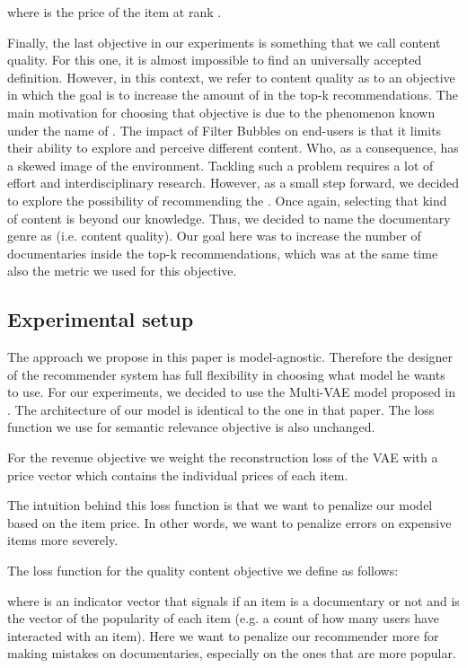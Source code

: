 \documentclass[letterpaper]{article}
\begin{document}
where  is the price of the item at rank . 

Finally, the last objective in our experiments is something that we call content quality. For this one, it is almost impossible to find an universally accepted definition. However, in this context, we refer to content quality as to an objective in which the goal is to increase the amount of  in the top-k recommendations. The main motivation for choosing that objective is due to the phenomenon known under the name of  \cite{nguyen2014exploring}. The impact of Filter Bubbles on end-users is that it limits their ability to explore and perceive different content. Who, as a consequence, has a skewed image of the environment. Tackling such a problem requires a lot of effort and interdisciplinary research. However, as a small step forward, we decided to explore the possibility of recommending the . Once again, selecting that kind of content is beyond our knowledge. Thus, we decided to name the documentary genre as  (i.e. content quality). Our goal here was to increase the number of documentaries inside the top-k recommendations, which was at the same time also the metric we used for this objective.

\subsection{Experimental setup}

The approach we propose in this paper is model-agnostic. Therefore the designer of the recommender system has full flexibility in choosing what model he wants to use. For our experiments, we decided to use the Multi-VAE model proposed in \cite{liang2018variational}. The architecture of our model is identical to the one in that paper. The loss function we use for semantic relevance objective is also unchanged.

For the revenue objective we weight the reconstruction loss of the VAE with a price vector which contains the individual prices of each item.


The intuition behind this loss function is that we want to penalize our model based on the item price. In other words, we want to penalize errors on expensive items more severely.

The loss function for the quality content objective we define as follows:



where  is an indicator vector that signals if an item is a documentary or not and  is the vector of the popularity of each item (e.g. a count of how many users have interacted with an item). Here we want to penalize our recommender more for making mistakes on documentaries, especially on the ones that are more popular.
\end{document}
